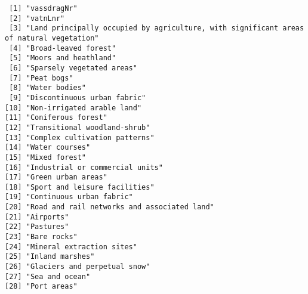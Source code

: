 \documentclass[
]{article}
\begin{document}
\begin{verbatim}
 [1] "vassdragNr"                                                                            
 [2] "vatnLnr"                                                                               
 [3] "Land principally occupied by agriculture, with significant areas of natural vegetation"
 [4] "Broad-leaved forest"                                                                   
 [5] "Moors and heathland"                                                                   
 [6] "Sparsely vegetated areas"                                                              
 [7] "Peat bogs"                                                                             
 [8] "Water bodies"                                                                          
 [9] "Discontinuous urban fabric"                                                            
[10] "Non-irrigated arable land"                                                             
[11] "Coniferous forest"                                                                     
[12] "Transitional woodland-shrub"                                                           
[13] "Complex cultivation patterns"                                                          
[14] "Water courses"                                                                         
[15] "Mixed forest"                                                                          
[16] "Industrial or commercial units"                                                        
[17] "Green urban areas"                                                                     
[18] "Sport and leisure facilities"                                                          
[19] "Continuous urban fabric"                                                               
[20] "Road and rail networks and associated land"                                            
[21] "Airports"                                                                              
[22] "Pastures"                                                                              
[23] "Bare rocks"                                                                            
[24] "Mineral extraction sites"                                                              
[25] "Inland marshes"                                                                        
[26] "Glaciers and perpetual snow"                                                           
[27] "Sea and ocean"                                                                         
[28] "Port areas"                                                                            

\end{verbatim}
\end{document}
